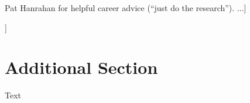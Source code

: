 \documentclass[sigconf]{acmart}
\begin{document}
\begin{acks}
[... Many thanks to all who helped me with this work: my supportive family, Andrew Glassner for teaching me everything I know about deep learning, Ken Perlin for, lots, but especially [An Image Synthesizer?] Pat Hanrahan for helpful career advice (“just do the research”). ...]
\par
[maybe just names (roughly backward in time): 
Ken Perlin,
Andrew Glassner,
Pat Hanrahan,
Karl Sims,
John Koza,
Richard Dawkins,
Witkin/Kass/Turk,
Peter Angeline,
Jordan Pollack.
and of course, Alan Turing. [too weird/maudlin? QQQ]
]
\end{acks}






\appendix

\section{Additional Section}
Text

\end{document}
